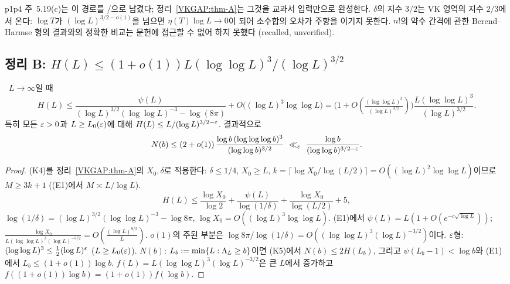 \begin{remark}\label{VKGAP:rem-A-new}
p1p4 주~5.19(c)는 이 경로를 \HEUR/\OPEN{}으로 남겼다; 정리~\ref{VKGAP:thm-A}는 그것을 교과서 입력만으로 완성한다.
$\delta$의 지수 $3/2$는 VK 영역의 지수 $2/3$에서 온다: $\log T$가 $(\log L)^{3/2-o(1)}$을 넘으면
$\eta(T)\log L\to0$이 되어 소수합의 오차가 주항을 이기지 못한다.
$n!$의 약수 간격에 관한 Berend--Harmse 형의 결과와의 정확한 비교는 문헌에 접근할 수 없어 하지 못했다 (recalled, unverified).
\end{remark}

\subsection{정리 B: $H(L)\le(1+o(1))L(\log\log L)^3/(\log L)^{3/2}$}
\label{VKGAP:sec-B}

\begin{theorem}[VKGAP-B]\label{VKGAP:thm-B}
\ $L\to\infty$일 때
\[
H(L)\le\frac{\psi(L)}{(\log L)^{3/2}(\log\log L)^{-3}-\log(8\pi)}+O\big((\log L)^3\log\log L\big)
=\big(1+O(\tfrac{(\log\log L)^3}{(\log L)^{3/2}})\big)\frac{L(\log\log L)^3}{(\log L)^{3/2}} .
\]
특히 모든 $\varepsilon>0$과 $L\ge L_0(\varepsilon)$에 대해 $H(L)\le L/(\log L)^{3/2-\varepsilon}$. 결과적으로
\[
N(b)\le(2+o(1))\,\frac{\log b\,(\log\log\log b)^3}{(\log\log b)^{3/2}}\ \ll_\varepsilon\ \frac{\log b}{(\log\log b)^{3/2-\varepsilon}} .
\]
\end{theorem}
\begin{proof}
(K4)를 정리~\ref{VKGAP:thm-A}의 $X_0,\delta$로 적용한다: $\delta\le1/4$, $X_0\ge L$,
$k=\lceil\log X_0/\log(L/2)\rceil=O((\log L)^2\log\log L)$이므로 $M\ge3k+1$ ((E1)에서 $M\asymp L/\log L$).
\[
H(L)\le\frac{\log X_0}{\log 2}+\frac{\psi(L)}{\log(1/\delta)}+\frac{\log X_0}{\log(L/2)}+5,
\]
$\log(1/\delta)=(\log L)^{3/2}(\log\log L)^{-3}-\log8\pi$, $\log X_0=O((\log L)^3\log\log L)$.
(E1)에서 $\psi(L)=L(1+O(e^{-c\sqrt{\log L}}))$; $\frac{\log X_0}{L(\log\log L)^3(\log L)^{-3/2}}=O(\frac{(\log L)^{9/2}}{L})$.
$o(1)$의 주된 부분은 $\log8\pi/\log(1/\delta)=O((\log\log L)^3(\log L)^{-3/2})$이다.
$\varepsilon$형: $(\log\log L)^3\le\frac12(\log L)^{\varepsilon}$ ($L\ge L_0(\varepsilon)$).
$N(b)$: $L_b:=\min\{L:\Lambda_L\ge b\}$이면 (K5)에서 $N(b)\le2H(L_b)$, 그리고 $\psi(L_b-1)<\log b$와 (E1)에서
$L_b\le(1+o(1))\log b$. $f(L)=L(\log\log L)^3(\log L)^{-3/2}$은 큰 $L$에서 증가하고 $f((1+o(1))\log b)=(1+o(1))f(\log b)$.
\end{proof}

